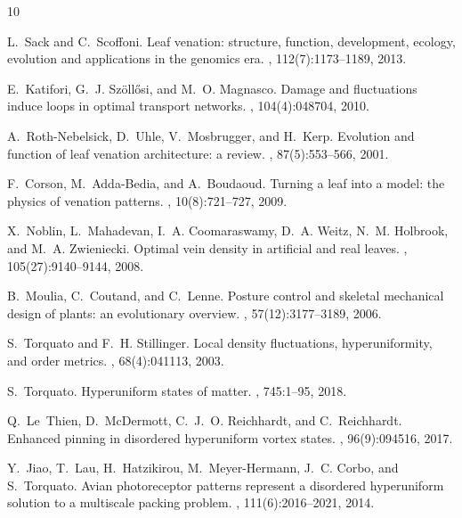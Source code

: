 \documentclass[10pt,twocolumn]{article}
\begin{document}

\begin{thebibliography}{10}

L.~Sack and C.~Scoffoni.
\newblock Leaf venation: structure, function, development, ecology, evolution and applications in the genomics era.
, 112(7):1173--1189, 2013.

E.~Katifori, G.~J. Sz{\"o}ll{\H{o}}si, and M.~O. Magnasco.
\newblock Damage and fluctuations induce loops in optimal transport networks.
, 104(4):048704, 2010.

A.~Roth-Nebelsick, D.~Uhle, V.~Mosbrugger, and H.~Kerp.
\newblock Evolution and function of leaf venation architecture: a review.
, 87(5):553--566, 2001.

F.~Corson, M.~Adda-Bedia, and A.~Boudaoud.
\newblock Turning a leaf into a model: the physics of venation patterns.
, 10(8):721--727, 2009.

X.~Noblin, L.~Mahadevan, I.~A. Coomaraswamy, D.~A. Weitz, N.~M. Holbrook, and M.~A. Zwieniecki.
\newblock Optimal vein density in artificial and real leaves.
, 105(27):9140--9144, 2008.

B.~Moulia, C.~Coutand, and C.~Lenne.
\newblock Posture control and skeletal mechanical design of plants: an evolutionary overview.
, 57(12):3177--3189, 2006.

S.~Torquato and F.~H. Stillinger.
\newblock Local density fluctuations, hyperuniformity, and order metrics.
, 68(4):041113, 2003.

S.~Torquato.
\newblock Hyperuniform states of matter.
, 745:1--95, 2018.

Q.~Le~Thien, D.~McDermott, C.~J.~O. Reichhardt, and C.~Reichhardt.
\newblock Enhanced pinning in disordered hyperuniform vortex states.
, 96(9):094516, 2017.

Y.~Jiao, T.~Lau, H.~Hatzikirou, M.~Meyer-Hermann, J.~C. Corbo, and S.~Torquato.
\newblock Avian photoreceptor patterns represent a disordered hyperuniform solution to a multiscale packing problem.
, 111(6):2016--2021, 2014.


\end{thebibliography}
\end{document}
